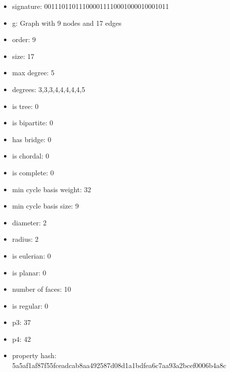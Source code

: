 \newpage
\begin{figure}
\end{figure}
\begin{itemize}
\item signature: 001110110111000011110001000010001011
\item g: Graph with 9 nodes and 17 edges
\item order: 9
\item size: 17
\item max degree: 5
\item degrees: 3,3,3,4,4,4,4,4,5
\item is tree: 0
\item is bipartite: 0
\item has bridge: 0
\item is chordal: 0
\item is complete: 0
\item min cycle basis weight: 32
\item min cycle basis size: 9
\item diameter: 2
\item radius: 2
\item is eulerian: 0
\item is planar: 0
\item number of faces: 10
\item is regular: 0
\item p3: 37
\item p4: 42
\item property hash: 5a5af1af87f55fceadcab8aa492587d08d1a1bdfea6c7aa93a2bcef0006b4a8c
\end{itemize}
